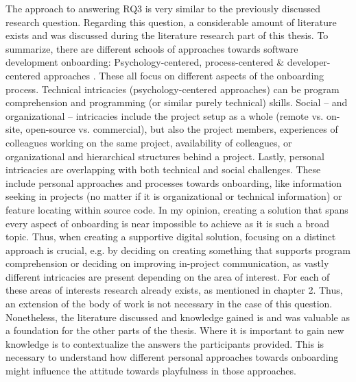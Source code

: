 The approach to answering RQ3 is very similar to the previously discussed research question. Regarding this question, a considerable amount of literature exists and was discussed during the literature research part of this thesis. To summarize, there are different schools of approaches towards software development onboarding: Psychology-centered, process-centered \& developer-centered approaches \cite{yates2014onboarding}. These all focus on different aspects of the onboarding process. Technical intricacies (psychology-centered approaches) can be program comprehension and programming (or similar purely technical) skills. Social -- and organizational -- intricacies include the project setup as a whole (remote vs. on-site, open-source vs. commercial), but also the project members, experiences of colleagues working on the same project, availability of colleagues, or organizational and hierarchical structures behind a project. Lastly, personal intricacies are overlapping with both technical and social challenges. These include personal approaches and processes towards onboarding, like information seeking in projects (no matter if it is organizational or technical information) or feature locating within source code. In my opinion, creating a solution that spans every aspect of onboarding is near impossible to achieve as it is such a broad topic. Thus, when creating a supportive digital solution, focusing on a distinct approach is crucial, e.g. by deciding on creating something that supports program comprehension or deciding on improving in-project communication, as vastly different intricacies are present depending on the area of interest. For each of these areas of interests research already exists, as mentioned in chapter 2. Thus, an extension of the body of work is not necessary in the case of this question. Nonetheless, the literature discussed and knowledge gained is and was valuable as a foundation for the other parts of the thesis. Where it is important to gain new knowledge is to contextualize the answers the participants provided. This is necessary to understand how different personal approaches towards onboarding might influence the attitude towards playfulness in those approaches.


